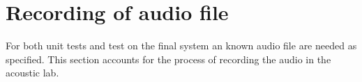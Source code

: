 \section{Recording of audio file}
For both unit tests and test on the final system an known audio file are needed as specified. This section accounts for the process of recording the audio in the acoustic lab. 
 

